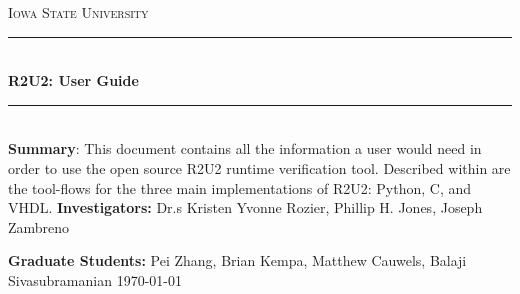 \documentclass{article}
\theoremstyle{definition}
\begin{document}
\begin{titlepage}
	\newcommand{\HRule}{\rule{\linewidth}{0.5mm}}
	\center %
	\textsc{\LARGE Iowa State University}\\[1.5cm]
	\HRule\\[0.4cm]
	{\huge\bfseries R2U2: User Guide}\\[0.4cm]
	\HRule\\[1.5cm]
	\vfill
	\textbf{Summary}: This document contains all the information a user would need in order to use the open source R2U2 runtime verification tool. Described within are the tool-flows for the three main implementations of R2U2: Python, C, and VHDL.
	\vfill
	\textbf{Investigators:} Dr.s Kristen Yvonne Rozier, Phillip H. Jones, Joseph Zambreno
	
	\textbf{Graduate Students:} Pei Zhang, Brian Kempa, Matthew Cauwels, Balaji Sivasubramanian
	\vfill
	{\large\today}
	\vfill
\end{titlepage}


\tableofcontents
\clearpage






\end{document}
